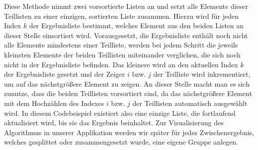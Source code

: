 Diese Methode nimmt zwei vorsortierte Listen an und setzt alle Elemente dieser Teillisten zu einer einzigen, sortierten Liste zusammen. Hierzu wird für jeden Index $k$ der Ergebnisliste bestimmt, welches Element aus den beiden Listen an dieser Stelle einsortiert wird. Vorausgesetzt, die Ergebnisliste enthält noch nicht alle Elemente mindestens einer Teilliste, werden bei jedem Schritt die jeweils kleinsten Elemente der beiden Teillisten miteinander verglichen, die sich noch nicht in der Ergebnisliste befinden. Das kleinere wird an den aktuellen Index $k$ der Ergebnisliste gesetzt und der Zeiger $i$ bzw. $j$ der Teilliste wird inkrementiert, um auf das nächstgrößere Element zu zeigen. An dieser Stelle macht man es sich zunutze, dass die beiden Teillisten vorsortiert sind, da das nächstgrößere Element mit dem Hochzählen des Indexes $i$ bzw. $j$ der Teillisten automatisch ausgewählt wird. In diesem Codebeispiel existiert also eine einzige Liste, die fortlaufend aktualisiert wird, bis sie das Ergebnis beinhaltet. Zur Visualisierung des Algorithmus in unserer Applikation werden wir später für jedes Zwischenergebnis, welches gesplittet oder zusammengesetzt wurde, eine eigene Gruppe anlegen.
